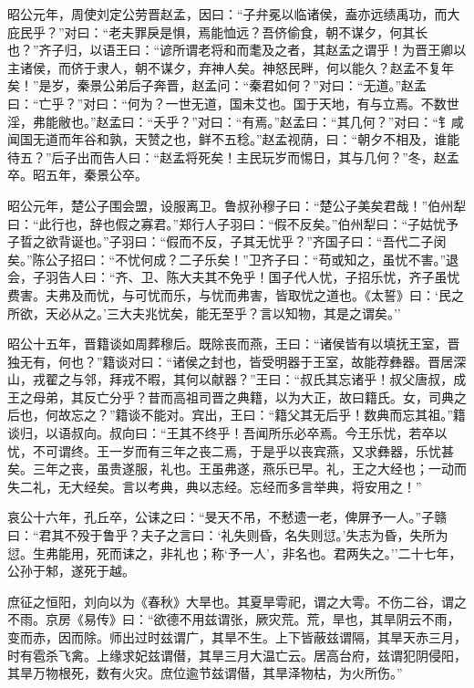 \documentclass[]{article}
\begin{document}
昭公元年，周使刘定公劳晋赵孟，因曰：``子弁冕以临诸侯，盍亦远绩禹功，而大庇民乎？''对曰：``老夫罪戾是惧，焉能恤远？吾侪偷食，朝不谋夕，何其长也？''齐子归，以语王曰：``谚所谓老将和而耄及之者，其赵孟之谓乎！为晋王卿以主诸侯，而侪于隶人，朝不谋夕，弃神人矣。神怒民畔，何以能久？赵孟不复年矣！''是岁，秦景公弟后子奔晋，赵孟问：``秦君如何？''对曰：``无道。''赵孟曰：``亡乎？''对曰：``何为？一世无道，国未艾也。国于天地，有与立焉。不数世淫，弗能敝也。''赵孟曰：``夭乎？''对曰：``有焉。''赵孟曰：``其几何？''对曰：``钅咸闻国无道而年谷和孰，天赞之也，鲜不五稔。''赵孟视荫，曰：``朝夕不相及，谁能待五？''后子出而告人曰：``赵孟将死矣！主民玩岁而惕日，其与几何？''冬，赵孟卒。昭五年，秦景公卒。

昭公元年，楚公子围会盟，设服离卫。鲁叔孙穆子曰：``楚公子美矣君哉！''伯州犁曰：``此行也，辞也假之寡君。''郑行人子羽曰：``假不反矣。''伯州犁曰：``子姑忧予子晢之欲背诞也。''子羽曰：``假而不反，子其无忧乎？''齐国子曰：``吾代二子闵矣。''陈公子招曰：``不忧何成？二子乐矣！''卫齐子曰：``苟或知之，虽忧不害。''退会，子羽告人曰：``齐、卫、陈大夫其不免乎！国子代人忧，子招乐忧，齐子虽忧费害。夫弗及而忧，与可忧而乐，与忧而弗害，皆取忧之道也。《太誓》曰：`民之所欲，天必从之。'三大夫兆忧矣，能无至乎？言以知物，其是之谓矣。''

昭公十五年，晋籍谈如周葬穆后。既除丧而燕，王曰：``诸侯皆有以填抚王室，晋独无有，何也？''籍谈对曰：``诸侯之封也，皆受明器于王室，故能荐彝器。晋居深山，戎翟之与邻，拜戎不暇，其何以献器？''王曰：``叔氏其忘诸乎！叔父唐叔，成王之母弟，其反亡分乎？昔而高祖司晋之典籍，以为大正，故曰籍氏。女，司典之后也，何故忘之？''籍谈不能对。宾出，王曰：``籍父其无后乎！数典而忘其祖。''籍谈归，以语叔向。叔向曰：``王其不终乎！吾闻所乐必卒焉。今王乐忧，若卒以忧，不可谓终。王一岁而有三年之丧二焉，于是乎以丧宾燕，又求彝器，乐忧甚矣。三年之丧，虽贵遂服，礼也。王虽弗遂，燕乐已早。礼，王之大经也；一动而失二礼，无大经矣。言以考典，典以志经。忘经而多言举典，将安用之！''

哀公十六年，孔丘卒，公诔之曰：``旻天不吊，不慭遗一老，俾屏予一人。''子赣曰：``君其不殁于鲁乎？夫子之言曰：`礼失则昏，名失则愆。'失志为昏，失所为愆。生弗能用，死而诔之，非礼也；称`予一人'，非名也。君两失之。''二十七年，公孙于邾，遂死于越。

庶征之恒阳，刘向以为《春秋》大旱也。其夏旱雩祀，谓之大雩。不伤二谷，谓之不雨。京房《易传》曰：``欲德不用兹谓张，厥灾荒。荒，旱也，其旱阴云不雨，变而赤，因而除。师出过时兹谓广，其旱不生。上下皆蔽兹谓隔，其旱天赤三月，时有雹杀飞禽。上缘求妃兹谓僣，其旱三月大温亡云。居高台府，兹谓犯阴侵阳，其旱万物根死，数有火灾。庶位逾节兹谓僣，其旱泽物枯，为火所伤。''
\end{document}
